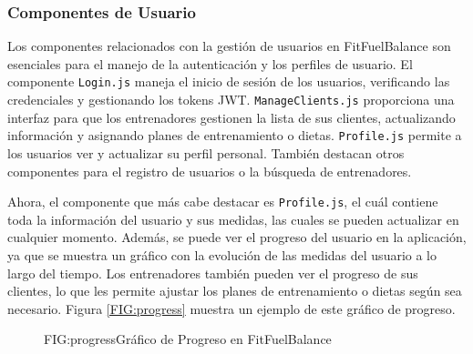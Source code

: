 \subsubsection{Componentes de Usuario}
Los componentes relacionados con la gestión de usuarios  en FitFuelBalance son esenciales para el manejo de la autenticación y los perfiles de usuario. El componente \texttt{Login.js} maneja el inicio de sesión de los usuarios, verificando las credenciales y gestionando los tokens JWT. \texttt{ManageClients.js} proporciona una interfaz para que los entrenadores gestionen la lista de sus clientes, actualizando información y asignando planes de entrenamiento o dietas. \texttt{Profile.js} permite a los usuarios ver y actualizar su perfil personal. También destacan otros componentes para el registro de usuarios o la búsqueda de entrenadores.

Ahora, el componente que más cabe destacar es \texttt{Profile.js}, el cuál contiene toda la información del usuario y sus medidas, las cuales se pueden actualizar en cualquier momento. Además, se puede ver el progreso del usuario en la aplicación, ya que se muestra un gráfico con la evolución de las medidas del usuario a lo largo del tiempo. Los entrenadores también pueden ver el progreso de sus clientes, lo que les permite ajustar los planes de entrenamiento o dietas según sea necesario. Figura \ref{FIG:progress} muestra un ejemplo de este gráfico de progreso.

\begin{figure}[Gráfico de Progreso]{FIG:progress}{Gráfico de Progreso en FitFuelBalance}
\end{figure}